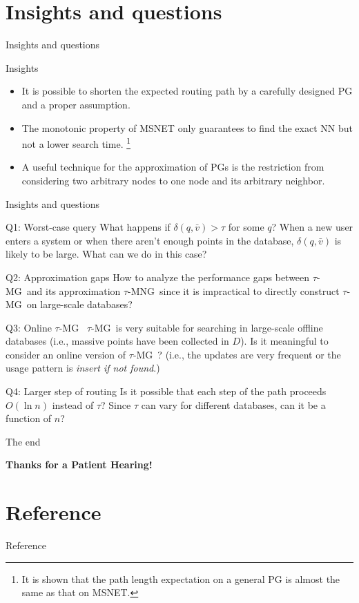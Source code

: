 \documentclass[12pt]{beamer}
\newcommand{\tauMG}{$\tau$-MG\ }
\newcommand{\tauMNG}{$\tau$-MNG\ }
\begin{document}
\section{Insights and questions}

\begin{frame}{Insights and questions}
  \begin{block}{Insights}
    \begin{itemize}
      \item It is possible to shorten the expected routing path by a carefully designed PG and a proper assumption.
      \item The monotonic property of MSNET \cite{fu_fast_2018} only guarantees to find the exact NN but not a lower search time. \footnote{It is shown that the path length expectation on a general PG is almost the same as that on MSNET.}
      \item A useful technique for the approximation of PGs is the restriction from considering two arbitrary nodes to one node and its arbitrary neighbor.
    \end{itemize}
  \end{block}
\end{frame}

\begin{frame}[allowframebreaks]{Insights and questions}
    \begin{block}{Q1: Worst-case query}
      What happens if $\delta(q, \bar{v}) > \tau$ for some $q$? When a new user enters a system or when there aren't enough points in the database, $\delta(q, \bar{v})$ is likely to be large. What can we do in this case? 
    \end{block}
    \begin{block}{Q2: Approximation gaps}
      How to analyze the performance gaps between \tauMG and its approximation \tauMNG since it is impractical to directly construct \tauMG on large-scale databases?
    \end{block}
    \framebreak
    \begin{block}{Q3: Online \tauMG}
      \tauMG is very suitable for searching in large-scale offline databases (i.e., massive points have been collected in $D$). Is it meaningful to consider an online version of \tauMG? (i.e., the updates are very frequent or the usage pattern is \textit{insert if not found}.)
    \end{block}
    \begin{block}{Q4: Larger step of routing}
      Is it possible that each step of the path proceeds $O(\ln n)$ instead of $\tau$? Since $\tau$ can vary for different databases, can it be a function of $n$?
    \end{block}
\end{frame}

\begin{frame}{The end}
  \begin{center}
    \begin{Large}
      \textbf{Thanks for a Patient Hearing!}
    \end{Large}
  \end{center}
\end{frame}

\section*{Reference}
\begin{frame}{Reference}
  \tiny
	
	
\end{frame}
\end{document}
